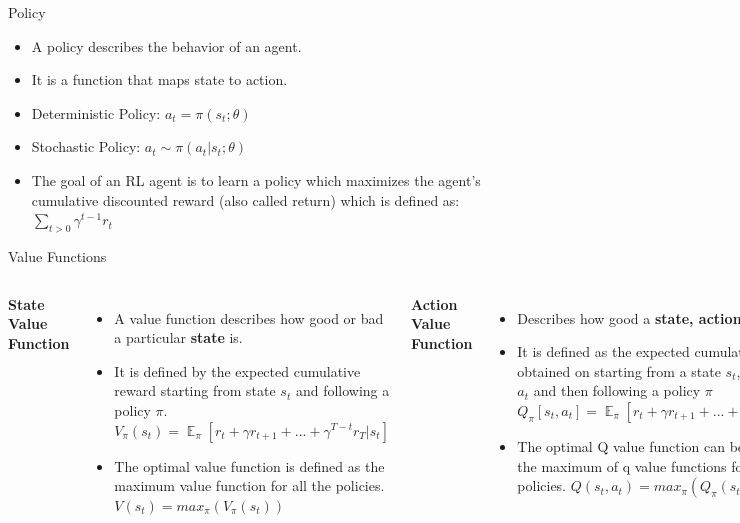 \begin{frame}{Policy}
\begin{itemize}
    \item A policy describes the behavior of an agent.
    \item It is a function that maps state to action.
    \item Deterministic Policy:
        $a_t = \pi(s_t; \theta)$
    \item Stochastic Policy:
        $a_t \sim \pi(a_t|s_t;\theta)$
    \item The goal of an RL agent is to learn a policy which maximizes the agent’s cumulative discounted reward (also called return) which is defined as: $\sum_{t > 0}\gamma^{t-1}r_t$
\end{itemize}
\end{frame}
\begin{frame}{Value Functions} 
\begin{columns}
\centering
\textbf{State Value Function}
\begin{itemize}
    \item A value function describes how good or bad a particular \textbf{state} is.
    \item It is defined by the expected cumulative reward starting from state $s_t$ and following a policy $\pi$.
    \newline
    $V_{\pi}(s_t) = \mathop{\mathbb{E}}_{\pi}[r_t + \gamma r_{t+1} + ... + \gamma^{T-t}r_{T} | s_t]$
    \item The optimal value function is defined as the maximum value function for all the policies.
    $V(s_t) = max_{\pi}(V_{\pi}(s_t))$
\end{itemize}
\centering
\textbf{Action Value Function}
\begin{itemize}
    \item Describes how good a \textbf{state, action} pair is.
    \item It is defined as the expected cumulative reward obtained on starting from a state $s_t$, taking action $a_t$ and then following a policy $\pi$
    \newline
    $Q_{\pi}[s_t,a_t] =\mathop{\mathbb{E}}_{\pi}[r_t + \gamma r_{t+1} + ... + \gamma^{T-t}r_{T} | s_t, a_t] $
    \item The optimal Q value function can be defined as the maximum of q value functions for all the policies.
    $Q(s_t, a_t) = max_{\pi}(Q_{\pi}(s_t, a_t))$
\end{itemize}
\end{columns}
    
\end{frame}
